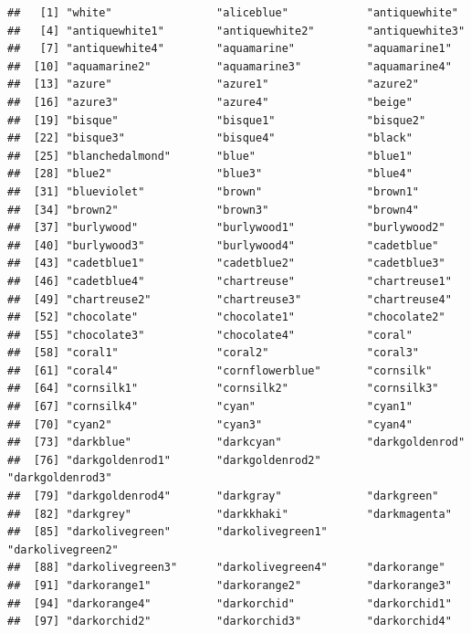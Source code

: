 \documentclass[
]{article}
\begin{document}
\begin{verbatim}
##   [1] "white"                "aliceblue"            "antiquewhite"        
##   [4] "antiquewhite1"        "antiquewhite2"        "antiquewhite3"       
##   [7] "antiquewhite4"        "aquamarine"           "aquamarine1"         
##  [10] "aquamarine2"          "aquamarine3"          "aquamarine4"         
##  [13] "azure"                "azure1"               "azure2"              
##  [16] "azure3"               "azure4"               "beige"               
##  [19] "bisque"               "bisque1"              "bisque2"             
##  [22] "bisque3"              "bisque4"              "black"               
##  [25] "blanchedalmond"       "blue"                 "blue1"               
##  [28] "blue2"                "blue3"                "blue4"               
##  [31] "blueviolet"           "brown"                "brown1"              
##  [34] "brown2"               "brown3"               "brown4"              
##  [37] "burlywood"            "burlywood1"           "burlywood2"          
##  [40] "burlywood3"           "burlywood4"           "cadetblue"           
##  [43] "cadetblue1"           "cadetblue2"           "cadetblue3"          
##  [46] "cadetblue4"           "chartreuse"           "chartreuse1"         
##  [49] "chartreuse2"          "chartreuse3"          "chartreuse4"         
##  [52] "chocolate"            "chocolate1"           "chocolate2"          
##  [55] "chocolate3"           "chocolate4"           "coral"               
##  [58] "coral1"               "coral2"               "coral3"              
##  [61] "coral4"               "cornflowerblue"       "cornsilk"            
##  [64] "cornsilk1"            "cornsilk2"            "cornsilk3"           
##  [67] "cornsilk4"            "cyan"                 "cyan1"               
##  [70] "cyan2"                "cyan3"                "cyan4"               
##  [73] "darkblue"             "darkcyan"             "darkgoldenrod"       
##  [76] "darkgoldenrod1"       "darkgoldenrod2"       "darkgoldenrod3"      
##  [79] "darkgoldenrod4"       "darkgray"             "darkgreen"           
##  [82] "darkgrey"             "darkkhaki"            "darkmagenta"         
##  [85] "darkolivegreen"       "darkolivegreen1"      "darkolivegreen2"     
##  [88] "darkolivegreen3"      "darkolivegreen4"      "darkorange"          
##  [91] "darkorange1"          "darkorange2"          "darkorange3"         
##  [94] "darkorange4"          "darkorchid"           "darkorchid1"         
##  [97] "darkorchid2"          "darkorchid3"          "darkorchid4"         

\end{verbatim}
\end{document}

